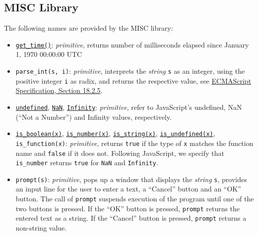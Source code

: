 \subsection*{MISC Library}


The following
names are provided by the MISC library:
\begin{itemize}
\item \href{https://sourceacademy.org/sicpjs/1.2.6\#ex_1.22}{\lstinline{get_time()}}: \textit{primitive}, returns number of milliseconds elapsed since January 1, 1970 00:00:00 UTC
\item \verb#parse_int#\texttt{(s, i)}: \textit{primitive}, 
interprets the \emph{string} \texttt{s} as an integer, using the positive integer \texttt{i} as radix, and returns the respective value,
see \href{https://www.ecma-international.org/ecma-262/9.0/index.html\#sec-parseint-string-radix}{\color{DarkBlue}ECMAScript Specification, Section 18.2.5}.
\item \href{https://sourceacademy.org/sicpjs/2.4.3\#p6}{\texttt{undefined}},
  \texttt{\href{https://www.ecma-international.org/ecma-262/9.0/index.html\#sec-value-properties-of-the-global-object-nan}{\color{DarkBlue}NaN}}, \texttt{\href{https://www.ecma-international.org/ecma-262/9.0/index.html\#sec-value-properties-of-the-global-object-infinity}{\color{DarkBlue}Infinity}}: \textit{primitive}, refer to JavaScript's undefined,
NaN (``Not a Number'') and Infinity values, respectively.
\item \href{https://sourceacademy.org/sicpjs/4.1.2\#p2}{\lstinline{is_boolean(x)}}, \href{https://sourceacademy.org/sicpjs/2.3.2\#p5}{\lstinline{is_number(x)}},
  \href{https://sourceacademy.org/sicpjs/2.3.2\#p7}{\lstinline{is_string(x)}}, \href{https://sourceacademy.org/sicpjs/4.1.2\#p2}{\lstinline{is_undefined(x)}}, \verb#is_function#\texttt{(x)}: \textit{primitive}, returns \texttt{true} if the type of \texttt{x} matches the function name and \texttt{false} if it does not. Following
        JavaScript, we specify that \verb#is_number# returns \texttt{true} for \texttt{NaN} and \texttt{Infinity}.
\item \texttt{prompt(s)}: \textit{primitive}, pops up a window that displays the \emph{string} \texttt{s}, provides
an input line for the user to enter a text, a ``Cancel'' button and an ``OK'' button. The call of \texttt{prompt}
suspends execution of the program until one of the two buttons is pressed. If 
the ``OK'' button is pressed, \texttt{prompt} returns the entered text as a string.
If the ``Cancel'' button is pressed, \texttt{prompt} returns a non-string value.

\end{itemize}
